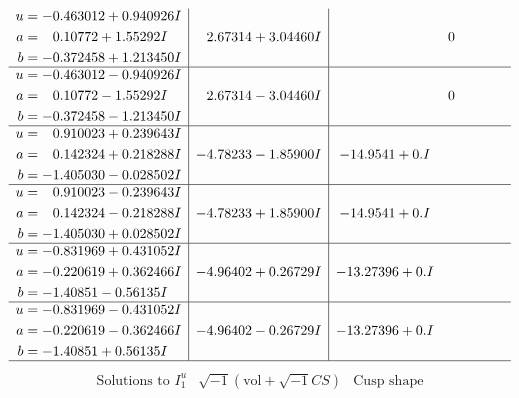 \documentclass[1p]{elsarticle_modified}
\theoremstyle{definition}
\newcommand{\I}{\sqrt{-1}}
\begin{document}
$$\begin{array}{c|c|c}
\begin{aligned}
u &= -0.463012 + 0.940926 I \\
a &= \phantom{-}0.10772 + 1.55292 I \\
b &= -0.372458 + 1.213450 I\end{aligned}
 & \phantom{-}2.67314 + 3.04460 I & \phantom{-0.000000 } 0 \\ \hline\begin{aligned}
u &= -0.463012 - 0.940926 I \\
a &= \phantom{-}0.10772 - 1.55292 I \\
b &= -0.372458 - 1.213450 I\end{aligned}
 & \phantom{-}2.67314 - 3.04460 I & \phantom{-0.000000 } 0 \\ \hline\begin{aligned}
u &= \phantom{-}0.910023 + 0.239643 I \\
a &= \phantom{-}0.142324 + 0.218288 I \\
b &= -1.405030 - 0.028502 I\end{aligned}
 & -4.78233 - 1.85900 I & -14.9541 + 0. I\phantom{ +0.000000I} \\ \hline\begin{aligned}
u &= \phantom{-}0.910023 - 0.239643 I \\
a &= \phantom{-}0.142324 - 0.218288 I \\
b &= -1.405030 + 0.028502 I\end{aligned}
 & -4.78233 + 1.85900 I & -14.9541 + 0. I\phantom{ +0.000000I} \\ \hline\begin{aligned}
u &= -0.831969 + 0.431052 I \\
a &= -0.220619 + 0.362466 I \\
b &= -1.40851 - 0.56135 I\end{aligned}
 & -4.96402 + 0.26729 I & -13.27396 + 0. I\phantom{ +0.000000I} \\ \hline\begin{aligned}
u &= -0.831969 - 0.431052 I \\
a &= -0.220619 - 0.362466 I \\
b &= -1.40851 + 0.56135 I\end{aligned}
 & -4.96402 - 0.26729 I & -13.27396 + 0. I\phantom{ +0.000000I}\\
 \hline 
 \end{array}$$\newpage$$\begin{array}{c|c|c}  
\text{Solutions to }I^u_{1}& \I (\text{vol} + \sqrt{-1}CS) & \text{Cusp shape}\\
 \hline 
\begin{aligned}

\end{aligned}
\end{array}$$
\end{document}
